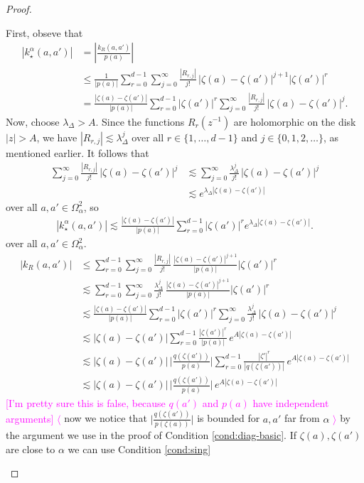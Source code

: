 \documentclass{article}
\theoremstyle{plain}
\newcommand{\softker}{k_\star}
\newcommand{\domain}{\Omega}
\begin{document}
\begin{proof}
\begin{itemize}
First, obseve that
\begin{align*}
|\softker^\alpha(a, a')| & = \left|\frac{k_R(a, a')}{p(a)}\right| \\
& \le \frac{1}{|p(a)|} \sum_{r=0}^{d-1}\sum_{j=0}^\infty \frac{|R_{r,j}|}{j!} \, |\zeta(a)-\zeta(a')|^{j+1} |\zeta(a')|^r \\
& = \frac{|\zeta(a)-\zeta(a')|}{|p(a)|} \sum_{r=0}^{d-1} |\zeta(a')|^r \sum_{j=0}^\infty \frac{|R_{r,j}|}{j!} \, |\zeta(a)-\zeta(a')|^j.
\end{align*}
Now, choose $\lambda_\Delta > A$. Since the functions $R_r(z^{-1})$ are holomorphic on the disk $|z| > A$, we have $|R_{r,j}| \lesssim \lambda_\Delta^j$ over all $r \in \{1, \ldots, d-1\}$ and $j \in \{0, 1, 2, \ldots\}$, as mentioned earlier. It follows that
\begin{align*}
\sum_{j=0}^\infty \frac{|R_{r,j}|}{j!} \, |\zeta(a)-\zeta(a')|^j
& \lesssim \sum_{j=0}^\infty \frac{\lambda_\Delta^j}{j!} \, |\zeta(a)-\zeta(a')|^j \\
& \lesssim e^{\lambda_\Delta|\zeta(a)-\zeta(a')|}
\end{align*}
over all $a, a' \in \domain_\alpha^2$, so
\begin{align*}
|\softker^\alpha(a, a')| \lesssim \frac{|\zeta(a)-\zeta(a')|}{|p(a)|} \sum_{r=0}^{d-1} |\zeta(a')|^r e^{\lambda_\Delta|\zeta(a)-\zeta(a')|}.
\end{align*}
over all $a, a' \in \domain_\alpha^2$.
\color{RoyalBlue}
\begin{align*}
|k_R(a,a')| & \le \sum_{r=0}^{d-1}\sum_{j=0}^\infty \frac{|R_{r,j}|}{j!} \, \frac{|\zeta(a)-\zeta(a')|^{j+1}}{|p(a)|}|\zeta(a')|^r \\
& \lesssim \sum_{r=0}^{d-1}\sum_{j=0}^\infty \frac{\lambda_\Delta^j}{j!} \, \frac{|\zeta(a)-\zeta(a')|^{j+1}}{|p(a)|}|\zeta(a')|^r \\
& \lesssim \frac{|\zeta(a)-\zeta(a')|}{|p(a)|} \sum_{r=0}^{d-1} |\zeta(a')|^r \sum_{j=0}^\infty \frac{\lambda_\Delta^j}{j!} \, |\zeta(a)-\zeta(a')|^j \\
& \lesssim |\zeta(a)-\zeta(a')| \sum_{r=0}^{d-1} \frac{|\zeta(a')|^r}{|p(a)|}\,  e^{A |\zeta(a)-\zeta(a')|}\\
& \lesssim |\zeta(a)-\zeta(a')| \, \Big\vert \frac{q(\zeta(a'))}{p(a)}\Big\vert \sum_{r=0}^{d-1} \frac{|\zeta'|^r}{|q(\zeta(a'))|} \, e^{A |\zeta(a)-\zeta(a')|}\\
& \lesssim |\zeta(a)-\zeta(a')| \, \Big\vert \frac{q(\zeta(a'))}{p(a)}\Big\vert \,  e^{A |\zeta(a)-\zeta(a')|}
\end{align*}
\color{black}
\textcolor{magenta}{[I'm pretty sure this is false, because $q(a')$ and $p(a)$ have independent arguments] $\langle$} now we notice that $\Big\vert \frac{q(\zeta(a'))}{p(\zeta(a))}\Big\vert$ is bounded for $a,a'$ far from $\alpha$ \textcolor{magenta}{$\rangle$} by the argument we use in the proof of Condition \eqref{cond:diag-basic}. If $\zeta(a), \zeta(a')$ are close to $\alpha$ we can use Condition \eqref{cond:sing}


\end{itemize}
\end{proof}
\end{document}
